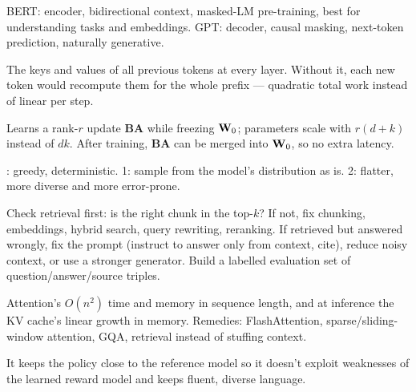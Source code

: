 \A BERT: encoder, bidirectional context, masked-LM pre-training, best for understanding tasks and embeddings. GPT: decoder, causal masking, next-token prediction, naturally generative.

\A The keys and values of all previous tokens at every layer. Without it, each new token would recompute them for the whole prefix --- quadratic total work instead of linear per step.

\A Learns a rank-$r$ update $\mathbf{BA}$ while freezing $\mathbf{W}_0$; parameters scale with $r(d+k)$ instead of $dk$. After training, $\mathbf{BA}$ can be merged into $\mathbf{W}_0$, so no extra latency.

: greedy, deterministic. 1: sample from the model's distribution as is. 2: flatter, more diverse and more error-prone.

\A Check retrieval first: is the right chunk in the top-$k$? If not, fix chunking, embeddings, hybrid search, query rewriting, reranking. If retrieved but answered wrongly, fix the prompt (instruct to answer only from context, cite), reduce noisy context, or use a stronger generator. Build a labelled evaluation set of question/answer/source triples.

\A Attention's $O(n^2)$ time and memory in sequence length, and at inference the KV cache's linear growth in memory. Remedies: FlashAttention, sparse/sliding-window attention, GQA, retrieval instead of stuffing context.

\A It keeps the policy close to the reference model so it doesn't exploit weaknesses of the learned reward model and keeps fluent, diverse language.
